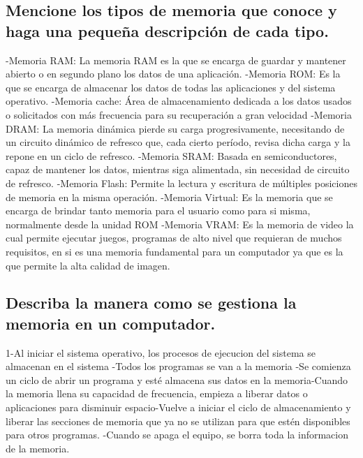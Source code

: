 \subsection{Mencione los tipos de memoria que conoce y haga una pequeña descripción de cada tipo.}
-Memoria RAM: La memoria RAM es la que se encarga de guardar y mantener abierto o en segundo plano los datos de una aplicación.\newline
-Memoria ROM: Es la que se encarga de almacenar los datos de todas las aplicaciones y del sistema operativo.\newline
-Memoria cache: Área de almacenamiento dedicada a los datos usados o solicitados con más frecuencia para su recuperación a gran velocidad \newline
-Memoria DRAM: La memoria dinámica pierde su carga progresivamente, necesitando de un circuito dinámico de refresco que, cada cierto período, revisa dicha carga y la repone en un ciclo de refresco. \newline
-Memoria SRAM: Basada en semiconductores, capaz de mantener los datos, mientras siga alimentada, sin necesidad de circuito de refresco. \newline
-Memoria Flash: Permite la lectura y escritura de múltiples posiciones de memoria en la misma operación. \newline
-Memoria Virtual: Es la memoria que se encarga de brindar tanto memoria para el usuario como para si misma, normalmente desde la unidad ROM \newline
-Memoria VRAM: Es la memoria de video la cual permite ejecutar juegos, programas de alto nivel que requieran de muchos requisitos, en si es una memoria fundamental para un computador ya que es la que permite la alta calidad de imagen. \newline
\subsection{Describa la manera como se gestiona la memoria en un computador.}
1-Al iniciar el sistema operativo, los procesos de ejecucion del sistema se almacenan en el sistema -Todos los programas se van a la memoria -Se comienza un ciclo de abrir un programa y esté almacena sus datos en la memoria-Cuando la memoria llena su capacidad de frecuencia, empieza a liberar datos o aplicaciones para disminuir espacio-Vuelve a iniciar el ciclo de almacenamiento y liberar las secciones de memoria que ya no se utilizan para que estén disponibles para otros programas. -Cuando se apaga el equipo, se borra toda la informacion de la memoria.\newline
